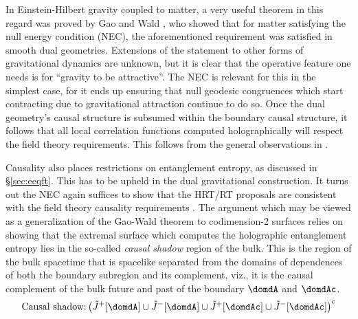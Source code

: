 \documentclass[12pt,openany]{book}
\begin{document}
In Einstein-Hilbert gravity coupled to matter, a very useful theorem in this regard was proved by Gao and Wald \cite{Gao:2000ga}, who showed that for matter satisfying the null energy condition (NEC), the aforementioned requirement was satisfied in smooth dual geometries. Extensions of the statement to other forms of gravitational dynamics are unknown, but it is clear that the operative feature one needs is for ``gravity to be attractive''. The NEC is relevant for this in the simplest case, for it ends up ensuring that null geodesic congruences which start contracting due to gravitational attraction continue to do so. Once the dual geometry's causal structure is subsumed within the boundary causal structure, it follows that all local correlation functions computed holographically will respect the field theory requirements. This follows from the general observations in \cite{Marolf:2004fy}.

Causality  also places restrictions on entanglement entropy, as discussed in \S\ref{sec:eeqft}.  This has to be upheld in the dual gravitational construction. It turns out the NEC again suffices to show that the HRT/RT proposals are consistent with the field theory causality requirements \cite{Wall:2012uf,Headrick:2014cta}.  The argument which may be viewed as a generalization of  the Gao-Wald theorem to codimension-2 surfaces relies on showing that the extremal surface which computes the holographic entanglement entropy lies in the so-called {\em causal shadow} region of the bulk. This is the region of the bulk spacetime that is spacelike separated from the domains of dependences of both the boundary subregion and its complement, viz., it is the causal complement of the bulk future and past of the boundary $\domdA$ and $\domdAc$.
%
\begin{equation}
\text{Causal shadow:} \left(\tilde{J}^+[\domdA] \cup \tilde{J}^-[\domdA] \cup \tilde{J}^+[\domdAc] \cup \tilde{J}^-[\domdAc] \right)^c
\label{eq:cshadow}
\end{equation}
%
\end{document}
